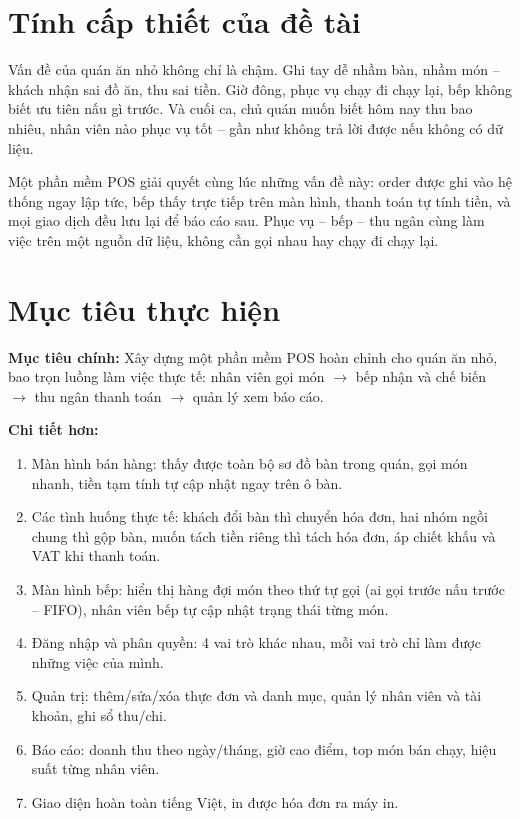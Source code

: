 \documentclass[12pt,a4paper]{report}
\begin{document}
\section{Tính cấp thiết của đề tài}

Vấn đề của quán ăn nhỏ không chỉ là chậm. Ghi tay dễ nhầm bàn, nhầm món -- khách nhận sai đồ ăn, thu sai tiền. Giờ đông, phục vụ chạy đi chạy lại, bếp không biết ưu tiên nấu gì trước. Và cuối ca, chủ quán muốn biết hôm nay thu bao nhiêu, nhân viên nào phục vụ tốt -- gần như không trả lời được nếu không có dữ liệu.

Một phần mềm POS giải quyết cùng lúc những vấn đề này: order được ghi vào hệ thống ngay lập tức, bếp thấy trực tiếp trên màn hình, thanh toán tự tính tiền, và mọi giao dịch đều lưu lại để báo cáo sau. Phục vụ -- bếp -- thu ngân cùng làm việc trên một nguồn dữ liệu, không cần gọi nhau hay chạy đi chạy lại.

\section{Mục tiêu thực hiện}

\textbf{Mục tiêu chính:} Xây dựng một phần mềm POS hoàn chỉnh cho quán ăn nhỏ, bao trọn luồng làm việc thực tế: nhân viên gọi món $\rightarrow$ bếp nhận và chế biến $\rightarrow$ thu ngân thanh toán $\rightarrow$ quản lý xem báo cáo.

\textbf{Chi tiết hơn:}
\begin{enumerate}
  \item Màn hình bán hàng: thấy được toàn bộ sơ đồ bàn trong quán, gọi món nhanh, tiền tạm tính tự cập nhật ngay trên ô bàn.
  \item Các tình huống thực tế: khách đổi bàn thì chuyển hóa đơn, hai nhóm ngồi chung thì gộp bàn, muốn tách tiền riêng thì tách hóa đơn, áp chiết khấu và VAT khi thanh toán.
  \item Màn hình bếp: hiển thị hàng đợi món theo thứ tự gọi (ai gọi trước nấu trước -- FIFO), nhân viên bếp tự cập nhật trạng thái từng món.
  \item Đăng nhập và phân quyền: 4 vai trò khác nhau, mỗi vai trò chỉ làm được những việc của mình.
  \item Quản trị: thêm/sửa/xóa thực đơn và danh mục, quản lý nhân viên và tài khoản, ghi sổ thu/chi.
  \item Báo cáo: doanh thu theo ngày/tháng, giờ cao điểm, top món bán chạy, hiệu suất từng nhân viên.
  \item Giao diện hoàn toàn tiếng Việt, in được hóa đơn ra máy in.
\end{enumerate}
\end{document}
